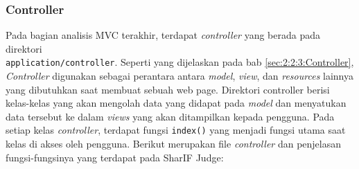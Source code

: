 \begin{comment}
      \item 24-Hour Log %
            \begin{figure}[H]
                  \centering
                  \texttt{[image: views/log.png]}
                  \caption{Halaman 24-Hour Log}
                  \label{fig:3:1:1:log}
            \end{figure}

            Gambar \ref{fig:3:1:1:log} menunjukkan halaman 24-Hour Log. Halaman ini hanya dapat di akses oleh \textit{role admin} dan \textit{head instructor}.

\end{itemize}
\end{comment}

\subsubsection{Controller}
\label{sec:3:1:1:controller}

Pada bagian analisis MVC terakhir, terdapat \textit{controller} yang berada pada direktori \\ \verb|application/controller|. Seperti yang dijelaskan pada bab \ref{sec:2:2:3:Controller}, \textit{Controller} digunakan sebagai perantara antara \textit{model}, \textit{view}, dan \textit{resources} lainnya yang dibutuhkan saat membuat sebuah web page. Direktori controller berisi kelas-kelas yang akan mengolah data yang didapat pada \textit{model} dan menyatukan data tersebut ke dalam \textit{views} yang akan ditampilkan kepada pengguna. Pada setiap kelas \textit{controller}, terdapat fungsi \verb|index()| yang menjadi fungsi utama saat kelas di akses oleh pengguna. Berikut merupakan file \textit{controller} dan penjelasan fungsi-fungsinya yang terdapat pada SharIF Judge:

